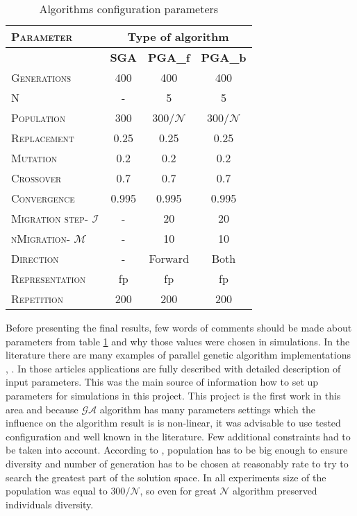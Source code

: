 \begin{table}[!htpb]
	\label{configuration}
	\caption{Algorithms configuration parameters}
	\centering
	\begin{tabular}{l||c|c|c}
        \textsc{Parameter} & \multicolumn{3}{c}{Type of algorithm} \\ \hline 
		 & \textbf{SGA} & \textbf{PGA\_f} & \textbf{PGA\_b} \\ \hline
		\textsc{Generations} 	&400	&400    &400    \\ \hline
		\textsc{N} 	&-	&5    &5    \\ \hline
		\textsc{Population} 	&300	&300/$\mathcal{N}$   &  300/$\mathcal{N}$  \\ \hline
		\textsc{Replacement}    &0.25   &0.25& 0.25 \\ \hline
		\textsc{Mutation}       &0.2    &0.2 &0.2   \\ \hline
		\textsc{Crossover}      &0.7    &0.7 &0.7   \\ \hline 
		\textsc{Convergence}    &0.995  &0.995& 0.995 \\ \hline
		\textsc{Migration step- $\mathcal{I}$}      &-& 20 &20 \\ \hline
		\textsc{nMigration- $\mathcal{M}$}     &-& 10 &10 \\ \hline
		\textsc{Direction}      &-& Forward & Both \\ \hline
		\textsc{Representation} &fp&fp&fp \\ \hline
		\textsc{Repetition} &200&200&200 \\ \hline
	\end{tabular}\newline
\end{table}
Before presenting the final results, few words of comments should be made about
parameters from table \ref{configuration} and why those values were chosen in
simulations. In the literature there are many examples of parallel genetic
algorithm implementations \cite{bib22}, \cite{bib27}. In those articles applications
are fully described with detailed description of input parameters. This was the
main source of information how to set up parameters for simulations in this
project. This project is the first work in this area and because $\mathcal{GA}$ algorithm 
has many parameters settings which the influence on the algorithm result is is
non-linear, it was advisable to use tested configuration and well known in the
literature. Few additional constraints had to be taken into account. According
to \cite{bib19}, population has to be big enough to ensure diversity and
number of generation has to be chosen at reasonably rate to try to search the
greatest part of the solution space. In all experiments size of the population
was equal to $300/\mathcal{N}$, so even for great $\mathcal{N}$ algorithm
preserved individuals diversity.  
